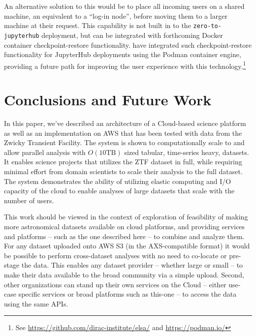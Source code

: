 \documentclass[twocolumn, linenumbers]{aastex631}
\begin{document}
An alternative solution to this would be to place all incoming users on a shared machine, an equivalent  to a ``log-in node'', before moving them to a larger machine at their request. This capability is not built in to the \texttt{zero-to-jupyterhub} deployment, but can be integrated with forthcoming Docker container checkpoint-restore functionality. \cite{elsa} have integrated such checkpoint-restore functionality for JupyterHub deployments using the Podman container engine, providing a future path for improving the user experience with this technology.\footnote{See \url{https://github.com/dirac-institute/elsa/} and \url{https://podman.io/}}

\section{Conclusions and Future Work} \label{sec:conclusions}

In this paper, we've described an architecture of a Cloud-based science platform as well as an implementation on AWS that has been tested with data from the Zwicky Transient Facility. The system is shown to computationally scale to and allow parallel analysis with $O(10\mathrm{TB})$ sized tabular, time-series heavy, datasets. It enables science projects that utilizes the ZTF dataset in full, while requiring minimal effort from domain scientists to scale their analysis to the full dataset. The system demonstrates the ability of utilizing elastic computing and I/O capacity of the cloud to enable analyses of large datasets that scale with the number of users.

This work should be viewed in the context of exploration of feasibility of making more astronomical datasets available on cloud platforms, and providing services and platforms -- such as the one described here -- to combine and analyze them. For any dataset uploaded onto AWS S3 (in the AXS-compatible format) it would be possible to perform cross-dataset analyses with no need to co-locate or pre-stage the data. This enables any dataset provider -- whether large or small -- to make their data available to the broad community via a simple upload. Second, other organizations can stand up their own services on the Cloud -- either use-case specific services or broad platforms such as this-one -- to access the data using the same APIs.
\end{document}
